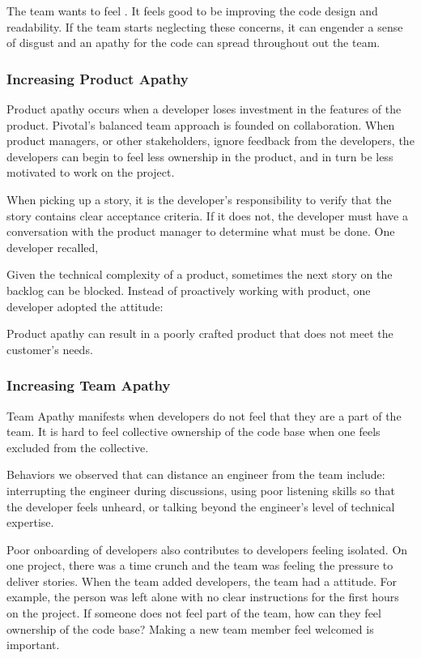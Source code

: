 The team wants to feel .  It feels good to be improving the code design and readability. If the team starts neglecting these concerns, it can engender a sense of disgust and an apathy for the code can spread throughout out the team.

\subsubsection{Increasing Product Apathy}
Product apathy occurs when a developer loses investment in the features of the product. Pivotal's balanced team approach is founded on collaboration. When product managers, or other stakeholders, ignore feedback from the developers, the developers can begin to feel less ownership in the product, and in turn be less motivated to work on the project.

When picking up a story, it is the developer's responsibility to verify that the story contains clear acceptance criteria. If it does not, the developer must have a conversation with the product manager to determine what must be done. One developer recalled,  

Given the technical complexity of a product, sometimes the next story on the backlog can be blocked. Instead of proactively working with product, one developer adopted the attitude:  

Product apathy can result in a poorly crafted product that does not meet the customer's needs.


\subsubsection{Increasing Team Apathy}
Team Apathy manifests when developers do not feel that they are a part of the team. It is hard to feel collective ownership of the code base when one feels excluded from the collective.

Behaviors we observed that can distance an engineer from the team include: interrupting the engineer during discussions, using poor listening skills so that the developer feels unheard, or talking beyond the engineer's level of technical expertise. 

Poor onboarding of developers also contributes to developers feeling isolated. On one project, there was a time crunch and the team was feeling the pressure to deliver stories. When the team added developers, the team had a  attitude. For example, the person was left alone with no clear instructions for the first hours on the project. If someone does not feel part of the team, how can they feel ownership of the code base? Making a new team member feel welcomed is important.

